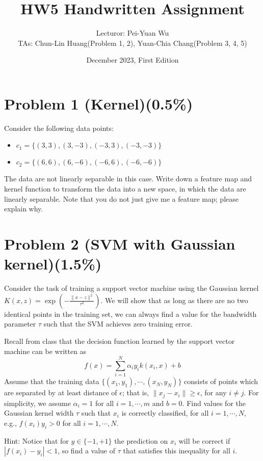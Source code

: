\documentclass{article}
\title{HW5 Handwritten Assignment}
\author{Lecturor: Pei-Yuan Wu\\
TAs: {Chun-Lin Huang(Problem 1, 2), Yuan-Chia Chang(Problem 3, 4, 5)}}
\date{December 2023, First Edition}
\begin{document}
\maketitle

\section*{Problem 1 (Kernel)(0.5\%)}
Consider the following data points:
\begin{itemize}
    \item $c_1=\{(3,3),(3,-3),(-3,3),(-3,-3)\}$
    \item $c_2=\{(6,6),(6,-6),(-6,6),(-6,-6)\}$
\end{itemize}
The data are not linearly separable in this case. Write down a feature map and kernel function to transform the data into a new space, in which the data are linearly separable. Note that you do not just give me a feature map; please explain why. 

\section*{Problem 2 (SVM with Gaussian kernel){(1.5\%)}}
Consider the task of training a support vector machine using the Gaussian kernel $K(x, z) = \exp(-\frac{\|x-z\|^2}{\tau^2})$. We will show that as long as there are no two identical points in the training set, we can always find a value for the bandwidth parameter $\tau$ such that the SVM achieves zero training error.

Recall from class that the decision function learned by the support vector machine
can be written as
\begin{equation*}
    f(x) = \sum_{i=1}^N \alpha_i y_i k(x_i, x) + b
\end{equation*}
Assume that the training data $\{(x_1, y_1), \cdots, (x_N, y_N)\}$ consists of points which are separated by at least distance of $\epsilon$; that is, $\|x_j - x_i\|\geq \epsilon$, for any $i\neq j$. For simplicity, we assume $\alpha_i = 1$ for all $i =1, \cdots, m$ and $b = 0$. Find values for the  Gaussian kernel width $\tau$ such that $x_i$ is correctly classified, for all $i=1, \cdots, N$, e.g., $f(x_i)y_i>0$ for all $i=1, \cdots, N$.

Hint: Notice that for $y \in\{-1,+1\}$ the prediction on $x_{i}$ will be correct if $\left|f\left(x_{i}\right)-y_{i}\right|<1$, so find a value of $\tau$ that satisfies this inequality for all $i$.
\end{document}
